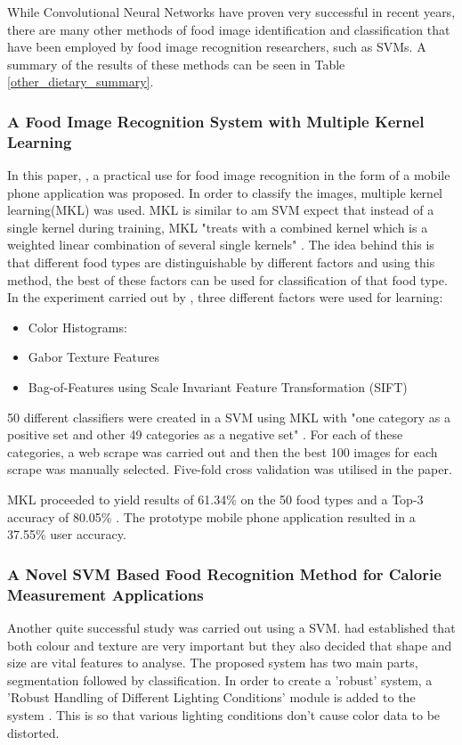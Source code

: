 While Convolutional Neural Networks have proven very successful in recent years, there are many other methods of food image identification and classification that have been employed by food image recognition researchers, such as SVMs.
A summary of the results of these methods can be seen in Table \ref{other_dietary_summary}.

\subsubsection*{A Food Image Recognition System with Multiple Kernel Learning}
In this paper, \parencite{kernelLearning}, a practical use for food image recognition in the form of a mobile phone application was proposed. In order to classify the images, multiple kernel learning(MKL) was used. MKL is similar to am SVM expect that instead of a single kernel during training, MKL "treats with a combined kernel which is a weighted linear combination of several single kernels" \parencite{kernelLearning}. The idea behind this is that different food types are distinguishable by different factors and using this method, the best of these factors can be used for classification of that food type. In the experiment carried out by \parencite{kernelLearning}, three different factors were used for learning:
\begin{itemize}
	\item{Color Histograms: }
	\item{Gabor Texture Features}
	\item{Bag-of-Features using Scale Invariant Feature Transformation (SIFT)}
\end{itemize}

50 different classifiers were created in a SVM using MKL with "one category as a positive set and other 49 categories as a negative set" \parencite{kernelLearning}.
For each of these categories, a web scrape was carried out and then the best 100 images for each scrape was manually selected. Five-fold cross validation was utilised in the paper.

MKL proceeded to yield results of 61.34\% on the 50 food types and a Top-3 accuracy of 80.05\% \parencite{kernelLearning}.
The prototype mobile phone application resulted in a 37.55\% user accuracy.

\subsubsection*{A Novel SVM Based Food Recognition Method for Calorie Measurement Applications}
Another quite successful study was carried out using a SVM. \parencite{novelSVM} had established that both colour and texture are very important but they also decided that shape and size are vital features to analyse. The proposed system has two main parts, segmentation followed by classification. In order to create a 'robust' system, a 'Robust Handling of Different Lighting Conditions' module is added to the system \parencite{novelSVM}. This is so that various lighting conditions don't cause color data to be distorted. 

